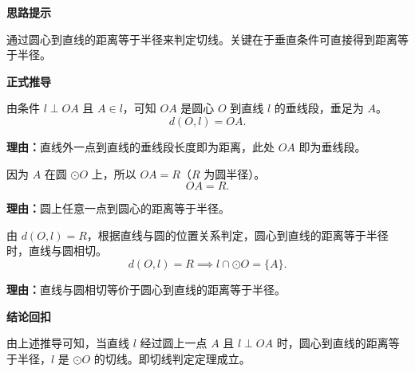 \begin{proofbox}
	\textbf{\textcolor{CProof}{思路提示}}

	通过圆心到直线的距离等于半径来判定切线。关键在于垂直条件可直接得到距离等于半径。

	\medskip
	\textbf{\textcolor{CProof}{正式推导}}
	\begin{description}[style=nextline, leftmargin=2.8em, labelsep=0.5em, itemsep=0.55em]
		\item[\textbf{步骤一（确定垂足）：}]由条件 $l \perp OA$ 且 $A \in l$，可知 $OA$ 是圆心 $O$ 到直线 $l$ 的垂线段，垂足为 $A$。
			\[
				d(O, l) = OA.
			\]
			\par\textbf{理由：}直线外一点到直线的垂线段长度即为距离，此处 $OA$ 即为垂线段。

		\item[\textbf{步骤二（等于半径）：}]因为 $A$ 在圆 $\odot O$ 上，所以 $OA = R$（$R$ 为圆半径）。
			\[
				OA = R.
			\]
			\par\textbf{理由：}圆上任意一点到圆心的距离等于半径。

		\item[\textbf{步骤三（距离相切）：}]由 $d(O, l) = R$，根据直线与圆的位置关系判定，圆心到直线的距离等于半径时，直线与圆相切。
			\[
				d(O, l) = R \implies l \cap \odot O = \{A\}.
			\]
			\par\textbf{理由：}直线与圆相切等价于圆心到直线的距离等于半径。
	\end{description}

	\medskip
	\textbf{\textcolor{CProof}{结论回扣}}

	由上述推导可知，当直线 $l$ 经过圆上一点 $A$ 且 $l \perp OA$ 时，圆心到直线的距离等于半径，$l$ 是 $\odot O$ 的切线。即切线判定定理成立。
\end{proofbox}
